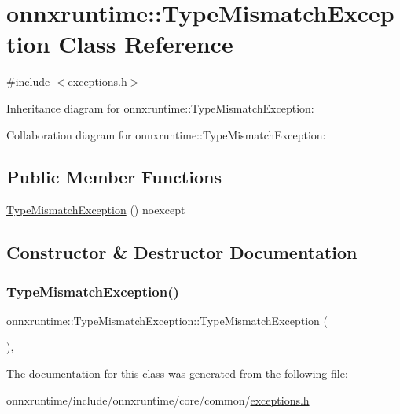\hypertarget{classonnxruntime_1_1TypeMismatchException}{}\section{onnxruntime\+:\+:Type\+Mismatch\+Exception Class Reference}
\label{classonnxruntime_1_1TypeMismatchException}


{\ttfamily \#include $<$exceptions.\+h$>$}



Inheritance diagram for onnxruntime\+:\+:Type\+Mismatch\+Exception\+:


Collaboration diagram for onnxruntime\+:\+:Type\+Mismatch\+Exception\+:
\subsection*{Public Member Functions}
\begin{DoxyCompactItemize}
\item 
\mbox{\hyperlink{classonnxruntime_1_1TypeMismatchException_aeea16f260512cec56f9c2fb83dc7d2a6}{Type\+Mismatch\+Exception}} () noexcept
\end{DoxyCompactItemize}


\subsection{Constructor \& Destructor Documentation}
\mbox{\label{classonnxruntime_1_1TypeMismatchException_aeea16f260512cec56f9c2fb83dc7d2a6}} 
\subsubsection{\texorpdfstring{Type\+Mismatch\+Exception()}{TypeMismatchException()}}
{\footnotesize\ttfamily onnxruntime\+::\+Type\+Mismatch\+Exception\+::\+Type\+Mismatch\+Exception (\begin{DoxyParamCaption}{ }\end{DoxyParamCaption})\hspace{0.3cm}{\ttfamily [inline]}, {\ttfamily [noexcept]}}



The documentation for this class was generated from the following file\+:\begin{DoxyCompactItemize}
\item 
onnxruntime/include/onnxruntime/core/common/\mbox{\hyperlink{exceptions_8h}{exceptions.\+h}}\end{DoxyCompactItemize}
